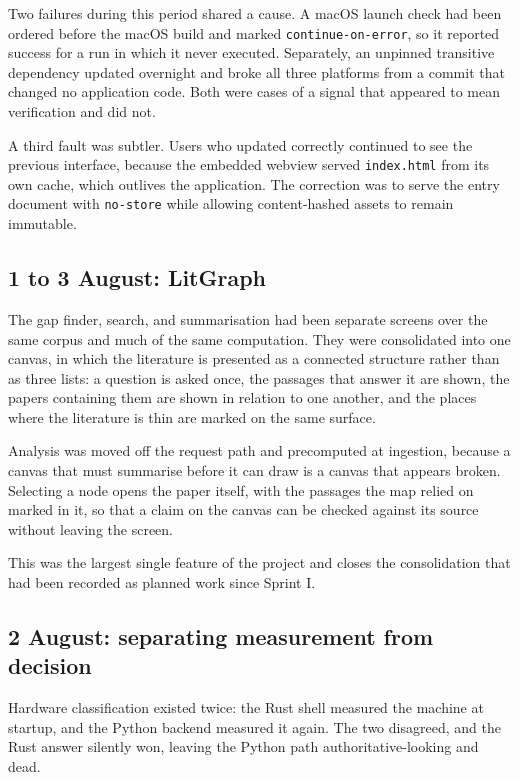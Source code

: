 \documentclass[11pt,a4paper]{article}
\begin{document}
Two failures during this period shared a cause. A macOS launch check had been
ordered before the macOS build and marked \texttt{continue-on-error}, so it
reported success for a run in which it never executed. Separately, an
unpinned transitive dependency updated overnight and broke all three platforms
from a commit that changed no application code. Both were cases of a signal
that appeared to mean verification and did not.

A third fault was subtler. Users who updated correctly continued to see the
previous interface, because the embedded webview served \texttt{index.html}
from its own cache, which outlives the application. The correction was to serve
the entry document with \texttt{no-store} while allowing content-hashed assets
to remain immutable.

\subsection{1 to 3 August: LitGraph}

The gap finder, search, and summarisation had been separate screens over the
same corpus and much of the same computation. They were consolidated into one
canvas, in which the literature is presented as a connected structure rather
than as three lists: a question is asked once, the passages that answer it are
shown, the papers containing them are shown in relation to one another, and the
places where the literature is thin are marked on the same surface.

Analysis was moved off the request path and precomputed at ingestion, because a
canvas that must summarise before it can draw is a canvas that appears broken.
Selecting a node opens the paper itself, with the passages the map relied on
marked in it, so that a claim on the canvas can be checked against its source
without leaving the screen.

This was the largest single feature of the project and closes the consolidation
that had been recorded as planned work since Sprint I.

\subsection{2 August: separating measurement from decision}

Hardware classification existed twice: the Rust shell measured the machine at
startup, and the Python backend measured it again. The two disagreed, and the
Rust answer silently won, leaving the Python path authoritative-looking and
dead.
\end{document}
